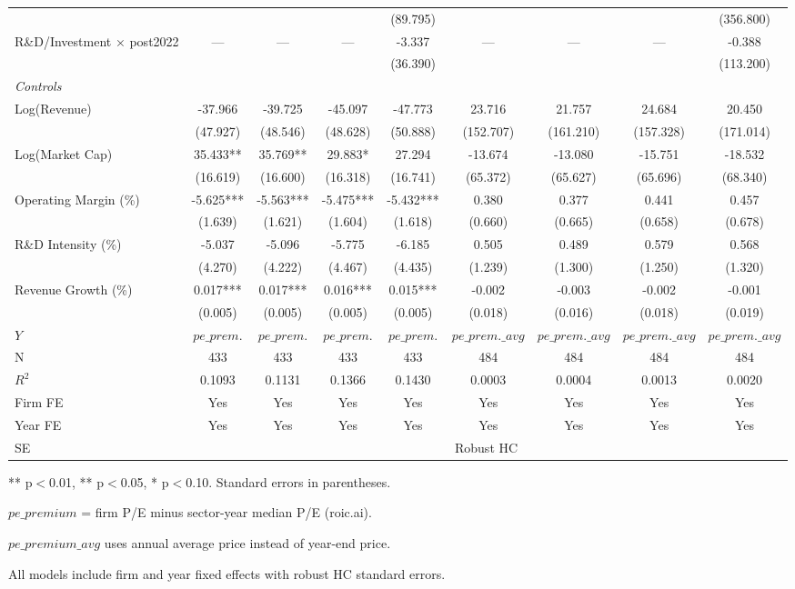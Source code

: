 \begin{table}[htbp]
\begin{tabular}{lcccc|cccc}
  &  &  &  & (89.795) &  &  &  & (356.800) \\
\quad R\&D/Investment × post2022 & — & — & — & -3.337 & — & — & — & -0.388 \\
  &  &  &  & (36.390) &  &  &  & (113.200) \\
\multicolumn{9}{l}{\textit{Controls}}\\
\quad Log(Revenue) & -37.966 & -39.725 & -45.097 & -47.773 & 23.716 & 21.757 & 24.684 & 20.450 \\
  & (47.927) & (48.546) & (48.628) & (50.888) & (152.707) & (161.210) & (157.328) & (171.014) \\
\quad Log(Market Cap) & 35.433** & 35.769** & 29.883* & 27.294 & -13.674 & -13.080 & -15.751 & -18.532 \\
  & (16.619) & (16.600) & (16.318) & (16.741) & (65.372) & (65.627) & (65.696) & (68.340) \\
\quad Operating Margin (\%) & -5.625*** & -5.563*** & -5.475*** & -5.432*** & 0.380 & 0.377 & 0.441 & 0.457 \\
  & (1.639) & (1.621) & (1.604) & (1.618) & (0.660) & (0.665) & (0.658) & (0.678) \\
\quad R\&D Intensity (\%) & -5.037 & -5.096 & -5.775 & -6.185 & 0.505 & 0.489 & 0.579 & 0.568 \\
  & (4.270) & (4.222) & (4.467) & (4.435) & (1.239) & (1.300) & (1.250) & (1.320) \\
\quad Revenue Growth (\%) & 0.017*** & 0.017*** & 0.016*** & 0.015*** & -0.002 & -0.003 & -0.002 & -0.001 \\
  & (0.005) & (0.005) & (0.005) & (0.005) & (0.018) & (0.016) & (0.018) & (0.019) \\
\hline
$Y$ & $pe\_prem.$ & $pe\_prem.$ & $pe\_prem.$ & $pe\_prem.$ & $pe\_prem.\_avg$ & $pe\_prem.\_avg$ & $pe\_prem.\_avg$ & $pe\_prem.\_avg$ \\
N & 433 & 433 & 433 & 433 & 484 & 484 & 484 & 484 \\
$R^2$ & 0.1093 & 0.1131 & 0.1366 & 0.1430 & 0.0003 & 0.0004 & 0.0013 & 0.0020 \\
Firm FE & Yes & Yes & Yes & Yes & Yes & Yes & Yes & Yes \\
Year FE & Yes & Yes & Yes & Yes & Yes & Yes & Yes & Yes \\
SE & \multicolumn{8}{c}{Robust HC} \\
\hline\hline
\end{tabular}
\begin{tablenotes}\small
\item *** p$<$0.01, ** p$<$0.05, * p$<$0.10. Standard errors in parentheses.
\item $pe\_premium$ = firm P/E minus sector-year median P/E (roic.ai).
\item $pe\_premium\_avg$ uses annual average price instead of year-end price.
\item All models include firm and year fixed effects with robust HC standard errors.
\end{tablenotes}
\end{table}
